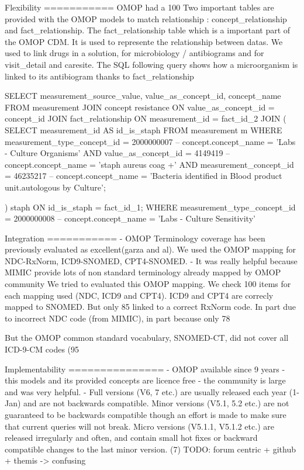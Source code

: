 Flexibility  
===========
OMOP had a 100%
Two important tables are provided with the OMOP models to  match relationship : concept_relationship and fact_relationship.
The fact_relationship table which is a important part of the OMOP CDM. It is used to represente the relationship between datas.
We used to link drugs in a solution, for  microbiology / antibiograms and for visit_detail and caresite.
The SQL following query shows how a microorganism is linked to its antibiogram thanks to fact_relationship

SELECT measurement_source_value, value_as_concept_id, concept_name
FROM measurement
JOIN concept resistance ON value_as_concept_id = concept_id
JOIN fact_relationship ON measurement_id =  fact_id_2
JOIN
(
	SELECT measurement_id AS id_is_staph
	FROM measurement m
	WHERE measurement_type_concept_id = 2000000007        			-- concept.concept_name = 'Labs - Culture Organisms'
	AND value_as_concept_id = 4149419                     			-- concept.concept_name = 'staph aureus coag +'
	AND measurement_concept_id = 46235217               			-- concept.concept_name = 'Bacteria identified in Blood product unit.autologous by Culture';

) staph ON id_is_staph = fact_id_1;
WHERE measurement_type_concept_id = 2000000008        			        -- concept.concept_name = 'Labs - Culture Sensitivity'


Integration
===========
- OMOP Terminology coverage has been previously evaluated as excellent(garza and al). We used the OMOP mapping for NDC-RxNorm, ICD9-SNOMED, CPT4-SNOMED.
- It was really helpful because MIMIC provide lots of non standard terminology already mapped by OMOP community
We tried to evaluated this OMOP mapping.
We check 100 items for each mapping used (NDC, ICD9 and CPT4). ICD9 and CPT4 are correcly mapped to SNOMED. But only 85%
linked to a correct RxNorm code. In part due to incorrect NDC code (from MIMIC), in part because only 78%

But the OMOP common standard vocabulary, SNOMED-CT, did not cover all ICD-9-CM codes (95%
 
Implementability
===============
- OMOP available since 9 years
- this models and its provided concepts are licence free
- the community is large and was very helpful.
- Full versions (V6, 7 etc.) are usually released each year (1-Jan) and are not backwards compatible. 
Minor versions (V5.1, 5.2 etc.) are not guaranteed to be backwards compatible though an effort is made to make sure that current queries will not break. 
Micro versions (V5.1.1, V5.1.2 etc.) are released irregularly and often, and contain small hot fixes or backward compatible changes to the last minor version.
(7)
TODO: forum centric + github + themis -> confusing

